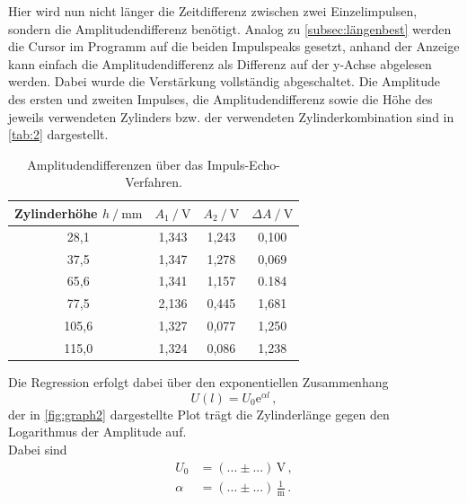 Hier wird nun nicht länger die Zeitdifferenz zwischen zwei Einzelimpulsen, sondern die Amplitudendifferenz benötigt.
Analog zu \autoref{subsec:längenbest} werden die Cursor im Programm auf die beiden Impulspeaks gesetzt, anhand der Anzeige kann einfach die Amplitudendifferenz
als Differenz auf der y-Achse abgelesen werden.
Dabei wurde die Verstärkung vollständig abgeschaltet.
Die Amplitude des ersten und zweiten Impulses, die Amplitudendifferenz sowie die Höhe des jeweils verwendeten Zylinders bzw. 
der verwendeten Zylinderkombination sind in \autoref{tab:2}
dargestellt.

\begin{table}
    \centering
    \caption{Amplitudendifferenzen über das Impuls-Echo-Verfahren.}
    \label{tab:2} 
    \begin{tabular}{c c c c}
    \toprule 
    {Zylinderhöhe $h \mathbin{/} \unit{\milli\meter}$} & {$A_1 \mathbin{/} \unit{\volt}$} & {$A_2 \mathbin{/} \unit{\volt}$} & {$\Delta A \mathbin{/} \unit{\volt}$}\\
    \midrule 
     28,1       &       1,343       &        1,243      &       0,100       \\       
     37,5       &       1,347       &        1,278      &       0,069       \\       
     65,6       &       1,341       &        1,157      &       0.184       \\       
     77,5       &       2,136       &        0,445      &       1,681       \\       
    105,6       &       1,327       &        0,077      &       1,250       \\
    115,0       &       1,324       &        0,086      &       1,238       \\               
    \bottomrule
    \end{tabular}  
\end{table}

Die Regression erfolgt dabei über den exponentiellen Zusammenhang
\begin{equation*}
    U(l) = U_0 \text{e}^{\alpha l} \,,
\end{equation*}
der in \autoref{fig:graph2} dargestellte Plot trägt die Zylinderlänge gegen den Logarithmus der Amplitude auf. \\
Dabei sind
\begin{align*}
    U_0     &= (... \pm ...) \,\unit{\volt} \,,\\
    \alpha  &= (... \pm ...) \,\frac{1}{\unit{\meter}} \,.
\end{align*}

